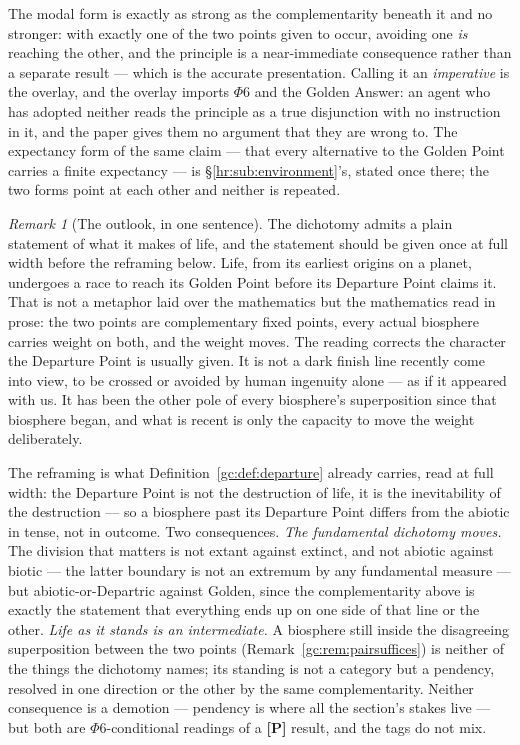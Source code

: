 \documentclass[11pt]{article}
\numberwithin{equation}{section}
\theoremstyle{plain}
\theoremstyle{definition}
\theoremstyle{remark}
\newtheorem{remark}[theorem]{Remark}
\begin{document}
The modal form is exactly as strong as the complementarity beneath it and no stronger: with exactly one of the two points given to occur, avoiding one \emph{is} reaching the other, and the principle is a near-immediate consequence rather than a separate result --- which is the accurate presentation. Calling it an \emph{imperative} is the overlay, and the overlay imports $\Phi6$ and the Golden Answer: an agent who has adopted neither reads the principle as a true disjunction with no instruction in it, and the paper gives them no argument that they are wrong to. The expectancy form of the same claim --- that every alternative to the Golden Point carries a finite expectancy --- is \S\ref{hr:sub:environment}'s, stated once there; the two forms point at each other and neither is repeated.

\begin{remark}[The outlook, in one sentence]\label{ac:rem:race}
The dichotomy admits a plain statement of what it makes of life, and the
statement should be given once at full width before the reframing below.
Life, from its earliest origins on a planet, undergoes a race to reach
its Golden Point before its Departure Point claims it. That is not a
metaphor laid over the mathematics but the mathematics read in prose:
the two points are complementary fixed points, every actual biosphere
carries weight on both, and the weight moves. The reading corrects the
character the Departure Point is usually given. It is not a dark finish
line recently come into view, to be crossed or avoided by human ingenuity
alone --- as if it appeared with us. It has been the other pole of every
biosphere's superposition since that biosphere began, and what is recent
is only the capacity to move the weight deliberately.
\end{remark}

The reframing is what Definition~\ref{gc:def:departure} already carries, read at full width: the Departure Point is not the destruction of life, it is the inevitability of the destruction --- so a biosphere past its Departure Point differs from the abiotic in tense, not in outcome. Two consequences. \emph{The fundamental dichotomy moves.} The division that matters is not extant against extinct, and not abiotic against biotic --- the latter boundary is not an extremum by any fundamental measure --- but abiotic-or-Departric against Golden, since the complementarity above is exactly the statement that everything ends up on one side of that line or the other. \emph{Life as it stands is an intermediate.} A biosphere still inside the disagreeing superposition between the two points (Remark~\ref{gc:rem:pairsuffices}) is neither of the things the dichotomy names; its standing is not a category but a pendency, resolved in one direction or the other by the same complementarity. Neither consequence is a demotion --- pendency is where all the section's stakes live --- but both are $\Phi6$-conditional readings of a \textbf{[P]} result, and the tags do not mix.
\end{document}
